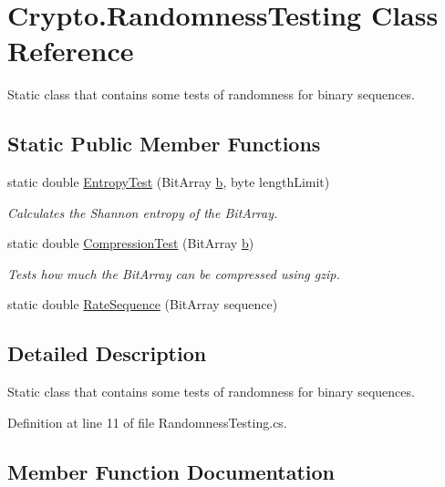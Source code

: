 \hypertarget{class_crypto_1_1_randomness_testing}{}\section{Crypto.\+Randomness\+Testing Class Reference}
\label{class_crypto_1_1_randomness_testing}


Static class that contains some tests of randomness for binary sequences.  


\subsection*{Static Public Member Functions}
\begin{DoxyCompactItemize}
\item 
static double \hyperlink{class_crypto_1_1_randomness_testing_a86ef256c8a7c87df3fdbbf5673465cb0}{Entropy\+Test} (Bit\+Array \hyperlink{jquery_8js_a2fa551895933fae935a0a6b87282241d}{b}, byte length\+Limit)
\begin{DoxyCompactList}\small\item\em Calculates the Shannon entropy of the Bit\+Array. \end{DoxyCompactList}\item 
static double \hyperlink{class_crypto_1_1_randomness_testing_af903b13649b40d4895243f51c62341cc}{Compression\+Test} (Bit\+Array \hyperlink{jquery_8js_a2fa551895933fae935a0a6b87282241d}{b})
\begin{DoxyCompactList}\small\item\em Tests how much the Bit\+Array can be compressed using gzip. \end{DoxyCompactList}\item 
static double \hyperlink{class_crypto_1_1_randomness_testing_a34e225189cd735e8cfa82f6ab3b7d97f}{Rate\+Sequence} (Bit\+Array sequence)
\end{DoxyCompactItemize}


\subsection{Detailed Description}
Static class that contains some tests of randomness for binary sequences. 



Definition at line 11 of file Randomness\+Testing.\+cs.



\subsection{Member Function Documentation}
\hypertarget{class_crypto_1_1_randomness_testing_af903b13649b40d4895243f51c62341cc}{}
